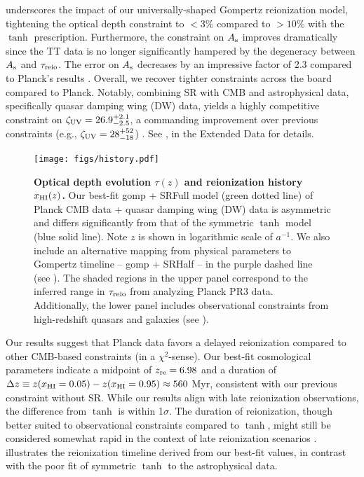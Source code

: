  underscores the impact of our universally-shaped
Gompertz reionization model, tightening the optical depth constraint to
$<3\%$ compared to $> 10\%$ with the $\tanh$ prescription.
Furthermore, the constraint on $A_\mathrm{s}$ improves dramatically since the TT
data is no longer significantly hampered by the degeneracy between $A_\mathrm{s}$
and $\tau_{\mathrm{reio}}$.
The error on $A_\mathrm{s}$ decreases by an impressive factor of 2.3 compared to
Planck's results \cite{Planck2020a}.
Overall, we recover tighter constraints across the board compared to
Planck.
Notably, combining SR with CMB and astrophysical data, specifically
quasar damping wing (DW) data, yields a highly competitive constraint on
$\zeta_\mathrm{UV} = 26.9^{+2.1}_{-2.5}$, a commanding improvement over previous
constraints (e.g., $\zeta_\mathrm{UV} = 28^{+52}_{-18}$) \cite{Greig2017}.
See ,  in the
Extended Data for details.

\begin{figure}[tb]
\centering
\texttt{[image: figs/history.pdf]}
\caption{\textbf{Optical depth evolution $\tau(z)$ and reionization
history $x_{\mathrm{HI}}(z)$.}
Our best-fit gomp + SRFull model (green dotted line) of Planck CMB data
+ quasar damping wing (DW) data is asymmetric and differs significantly
from that of the symmetric $\tanh$ model (blue solid line).
Note $z$ is shown in logarithmic scale of $a^{-1}$.
We also include an alternative mapping from physical parameters to
Gompertz timeline -- gomp + SRHalf -- in the purple dashed line (see
).
The shaded regions in the upper panel correspond to the inferred range
in $\tau_{\mathrm{reio}}$ from analyzing Planck PR3 data.
Additionally, the lower panel includes observational constraints from
high-redshift quasars and galaxies (see ).}
\label{fig:history} \end{figure}

Our results suggest that Planck data favors a delayed reionization
compared to other CMB-based constraints (in a $\chi^2$-sense).
Our best-fit cosmological parameters indicate a midpoint of $z_{\mathrm{re}} =
6.98$ and a duration of $\Delta z \equiv z(x_{\mathrm{HI}} = 0.05) - z(x_{\mathrm{HI}} =
0.95) \approx 560 $ Myr, consistent with our previous constraint
without SR.
While our results align with late reionization observations, the
difference from $\tanh$ is within 1$\sigma$.
The duration of reionization, though better suited to observational
constraints compared to $\tanh$, might still be considered somewhat
rapid in the context of late reionization scenarios \cite{Cain2021}.
 illustrates the reionization timeline derived from
our best-fit values, in contrast with the poor fit of symmetric $\tanh$
to the astrophysical data.

